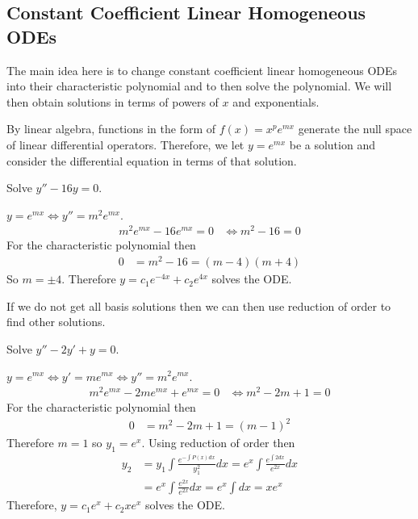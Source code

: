 \documentclass[notes]{subfiles}
\begin{document}
\subsection{Constant Coefficient Linear Homogeneous ODEs}
The main idea here is to change constant coefficient linear homogeneous ODEs into their characteristic polynomial and to then solve the polynomial. We will then obtain solutions in terms of powers of $x$ and exponentials.

By linear algebra, functions in the form of $f(x) = x^p e^{mx}$ generate the null space of linear differential operators. Therefore, we let $y = e^{mx}$ be a solution and consider the differential equation in terms of that solution.

\begin{exercise}
    Solve $y'' - 16y = 0$.
\end{exercise}
\begin{solution}
    $y = e^{mx} \iff y'' = m^2 e^{mx}$.
    \begin{align*}
        m^2 e^{mx} - 16e^{mx} = 0
        &\iff m^2 - 16 = 0
    \end{align*}
    For the characteristic polynomial then
    \begin{align*}
        0
        &= m^2 - 16
        = (m - 4)(m + 4)
    \end{align*}
    So $m = \pm 4$.
    Therefore $y = c_1 e^{-4x} + c_2 e^{4x}$ solves the ODE.
\end{solution}

If we do not get all basis solutions then we can then use reduction of order to find other solutions.

\begin{exercise}
    Solve $y'' - 2y' + y = 0$.
\end{exercise}
\begin{solution}
    $y = e^{mx} \iff y' = me^{mx} \iff y'' = m^2e^{mx}$.
    \begin{align*}
        m^2e^{mx} - 2me^{mx} + e^{mx} = 0
        &\iff m^2 - 2m + 1 = 0
    \end{align*}
    For the characteristic polynomial then
    \begin{align*}
        0
        &= m^2 - 2m + 1
        = (m - 1)^2
    \end{align*}
    Therefore $m = 1$ so $y_1 = e^x$. Using reduction of order then
    \begin{align*}
        y_2
        &= y_1 \int \frac{e^{-\int P(x)dx}}{y_1^2}dx
        = e^x \int \frac{e^{\int 2dx}}{e^{2x}}dx \\
        &= e^x \int \frac{e^{2x}}{e^{2x}}dx
        = e^x \int dx
        = xe^x 
    \end{align*}
    Therefore, $y = c_1e^x + c_2xe^x$ solves the ODE.
\end{solution}
\end{document}
